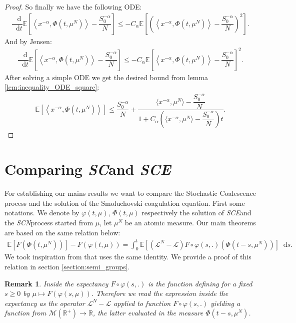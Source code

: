 \documentclass[11pt,a4paper]{article}
\newcommand{\RR}{\mathbb{R}}
\newcommand{\MC}{\mathcal{M}}
\newcommand{\LC}{\mathcal{L}}
\newcommand{\SC}{{\emph{SC}}}
\newcommand{\SCE}{\emph{SCE}}
\newcommand{\SCN}{\emph{SCN}}
\newcommand{\E}[1]{\mathbb{E}\left[#1\right]}
\newcommand{\dd}{\mathop{}\!\mathrm{d}}
\newtheorem{remark}[theorem]{Remark}
\begin{document}
\begin{proof}
    So finally we have the following ODE:
    \begin{align*}
        \dfrac{\dd}{\dd t} \E{\left\langle x^{-\alpha},\Phi(t,\mu^N)\right\rangle- \dfrac{S_0^{-\alpha}}{N}} \leq -C_\alpha\E{\left(\left\langle x^{-\alpha},\Phi(t,\mu^N)\right\rangle - \dfrac{S_0^{-\alpha}}{N}\right)^2}.
    \end{align*}
    And by Jensen:
   \begin{align*}
        \dfrac{\dd}{\dd t} \E{\left\langle x^{-\alpha},\Phi(t,\mu^N)\right\rangle- \dfrac{S_0^{-\alpha}}{N}} \leq -C_\alpha\E{\left\langle x^{-\alpha},\Phi(t,\mu^N)\right\rangle - \dfrac{S_0^{-\alpha}}{N}}^2.
    \end{align*}
    After solving a simple ODE we get the desired bound from lemma \ref{lem:inequality_ODE_square}:
    \begin{align*}
        \E{\left\langle x^{-\alpha},\Phi(t,\mu^N)\right\rangle} \leq \dfrac{S_0^{-\alpha}}{N} + \dfrac{\langle x^{-\alpha},\mu^N \rangle - \dfrac{S_0^{-\alpha}}{N}}{1 + C_\alpha \left(\langle x^{-\alpha},\mu^N \rangle - \dfrac{S_0^{-\alpha}}{N}\right)t}.
    \end{align*}
\end{proof}


\section{Comparing \SC and \SCE}
For establishing our mains results we want to compare the Stochastic Coalescence process and the solution of the Smoluchovski coagulation equation. First some notations. We denote by $\varphi(t,\mu)$, $\Phi(t,\mu)$ respectively the solution of \SCE and the \SCN process started from $\mu$, let $\mu^N$ be an atomic measure.
Our main theorems are based on the same relation below:
\begin{align}\label{eq:semi-group-relation}
\E{F(\Phi(t,\mu^N))} - F(\varphi\left(t,\mu\right)) = \int_0^t \E{\left(\LC^N - \LC\right)F\circ \varphi(s,.)\left(\Phi(t-s,\mu^N)\right)}\dd s.
\end{align}
We took inspiration from \cite{kolokoltsov2010central} that uses the same identity. We provide a proof of this relation in section \ref{section:semi_groups}.
\begin{remark}
    Inside the expectancy $F\circ \varphi(s,.)$ is the function defining for a fixed $s \geq 0$ by $\mu \mapsto F\left(\varphi(s,\mu)\right)$. Therefore we read the expression inside the expectancy as the operator $\LC^N - \LC$ applied to function $F\circ \varphi(s,.)$ yielding a function from $\MC(\RR^+) \to \RR $, the latter evaluated in the measure $\Phi(t-s,\mu^N)$.
\end{remark}
\end{document}

